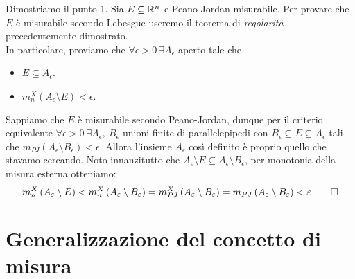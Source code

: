 \begin{demonstration}
	Dimostriamo il punto 1. Sia $E\subseteq \realset^n$ e Peano-Jordan misurabile. Per provare che $E$ è misurabile secondo Lebesgue useremo il teorema di \textit{regolarità} precedentemente dimostrato.\\
	In particolare, proviamo che $\forall \epsilon >0\ \exists A_{\epsilon}$ aperto tale che
	\begin{itemize}
		\item $E\subseteq A_{\epsilon}$.
		\item $m_n^{X}\left(A_{\epsilon}\setminus E\right)<\epsilon$.
	\end{itemize}
Sappiamo che $E$ è misurabile secondo Peano-Jordan, dunque per il criterio equivalente $\forall \epsilon >0 \ \exists A_{\epsilon},\ B_{\epsilon}$ unioni finite di parallelepipedi con $B_{\epsilon}\subseteq E\subseteq A_{\epsilon}$ tali che $m_{PJ}\left(A_{\epsilon}\setminus B_{\epsilon}\right)<\epsilon$. Allora l'insieme $A_{\epsilon}$ così definito è proprio quello che stavamo cercando. Noto innanzitutto che $A_{\epsilon}\setminus E\subseteq A_{\epsilon}\setminus B_{\epsilon}$, per monotonia della misura esterna otteniamo:
\begin{equation*}
	m_{n}^{X}\left(A_{\epsilon}\setminus E\right)<	m_{n}^{X}\left(A_{\epsilon}\setminus B_{\epsilon}\right)=m_{PJ}^X\left(A_{\epsilon}\setminus B_{\epsilon}\right)=m_{PJ}\left(A_{\epsilon}\setminus B_{\epsilon}\right)<\epsilon\qedhere
\end{equation*}
\end{demonstration}
\section{Generalizzazione del concetto di misura}

